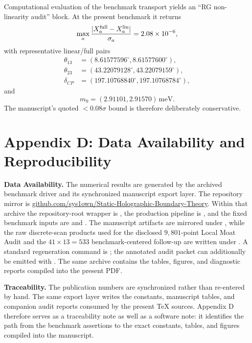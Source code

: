 \documentclass[11pt]{article}
\makeatletter
\newcommand{\manualappendixlabel}[2]{%
  \begingroup
  \def\@currentlabel{#1}%
  \label{#2}%
  \endgroup
}
\makeatother
\begin{document}
Computational evaluation of the benchmark transport yields an ``RG non-linearity audit'' block. At the present benchmark it returns
\begin{equation}
 \max_a\frac{|X_a^{\rm full}-X_a^{\rm lin}|}{\sigma_a}=2.08\times10^{-6},
\end{equation}
with representative linear/full pairs
\begin{equation}
 \begin{aligned}
 \theta_{13}&=(8.61577596^{\circ},8.61577600^{\circ}), \\
 \theta_{23}&=(43.22079128^{\circ},43.22079159^{\circ}), \\
 \delta_{CP}&=(197.10768840^{\circ},197.10768784^{\circ}),
 \end{aligned}
\end{equation}
and
\begin{equation}
 m_0=(2.91101,2.91570)\,\mathrm{meV}.
\end{equation}
The manuscript's quoted $<0.08\sigma$ bound is therefore deliberately conservative.

\section*{Appendix D: Data Availability and Reproducibility}\manualappendixlabel{D}{app:computational}

\noindent\textbf{Data Availability.} The numerical results are generated by the archived benchmark driver and its synchronized manuscript export layer. The repository mirror is \url{github.com/sys1own/Static-Holographic-Boundary-Theory}. Within that archive the repository-root wrapper is , the production pipeline is , and the fixed benchmark inputs are  and . The manuscript artifacts are mirrored under , while the raw discrete-scan products used for the disclosed $9{,}801$-point Local Moat Audit and the $41\times13=533$ benchmark-centered follow-up are written under . A standard regeneration command is ; the annotated audit packet can additionally be emitted with . The same archive contains the tables, figures, and diagnostic reports compiled into the present PDF.

\noindent\textbf{Traceability.} The publication numbers are synchronized rather than re-entered by hand. The same export layer writes the constants, manuscript tables, and companion audit reports consumed by the present \TeX{} sources. Appendix D therefore serves as a traceability note as well as a software note: it identifies the path from the benchmark assertions to the exact constants, tables, and figures compiled into the manuscript.
\end{document}
